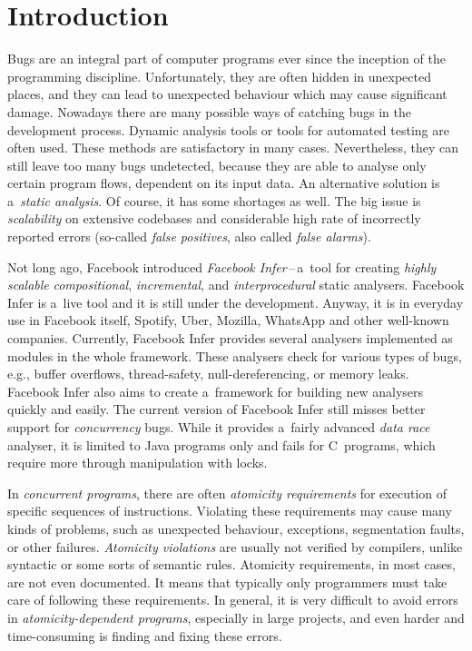 

\chapter{Introduction}

Bugs are an integral part of computer programs ever since the inception
of the programming discipline. Unfortunately, they are often hidden
in unexpected places, and they can lead to unexpected behaviour which
may cause significant damage. Nowadays there are many possible
ways of catching bugs in the development process. Dynamic analysis
tools or tools for automated testing are often used. These methods
are satisfactory in many cases. Nevertheless, they can still leave
too many bugs undetected, because they are able to analyse only
certain program flows, dependent on its input data. An alternative
solution is a~\emph{static analysis}. Of course, it has some shortages
as well. The big issue is \emph{scalability} on extensive codebases and
considerable high rate of incorrectly reported errors (so-called 
\emph{false positives}, also called \emph{false alarms}).

Not long ago, Facebook introduced \emph{Facebook Infer}\,--\,a~tool for 
creating \emph{highly scalable} \emph{compositional}, \emph{incremental},
and \emph{interprocedural} static analysers. Facebook Infer is a~live tool 
and it is still under the development. Anyway, it is in everyday use in
Facebook itself, Spotify, Uber, Mozilla, WhatsApp and other well-known
companies. Currently, Facebook Infer provides several analysers implemented
as modules in the whole framework. These analysers check for various types
of bugs, e.g., buffer overflows, thread-safety, null-dereferencing, or
memory leaks. Facebook Infer also aims to create a~framework for building
new analysers quickly and easily. The current version of Facebook Infer still
misses better support for \emph{concurrency} bugs. While it provides a~fairly
advanced \emph{data race} analyser, it is limited to Java programs only and 
fails for C~programs, which require more through manipulation with locks. 

In \emph{concurrent programs}, there are often \emph{atomicity requirements} 
for execution of specific sequences of instructions. Violating these 
requirements may cause many kinds of problems, such as unexpected
behaviour, exceptions, segmentation faults, or other failures. 
\emph{Atomicity violations} are usually not verified by compilers, 
unlike syntactic or some sorts of semantic rules. Atomicity requirements,
in most cases, are not even documented. It means that typically only 
programmers must take care of following these requirements. In general, 
it is very difficult to avoid errors in \emph{atomicity-dependent
programs}, especially in large projects, and even harder and time-consuming 
is finding and fixing these errors.

